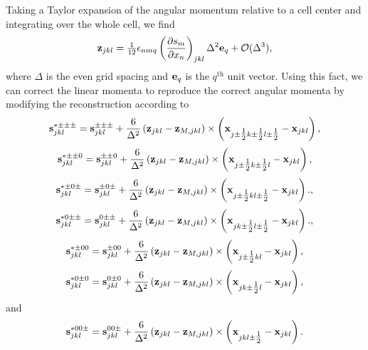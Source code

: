 \documentclass{aastex63}
\begin{document}
Taking a Taylor expansion of the angular momentum relative to a cell center and integrating over the whole cell, we find
\begin{equation}
{\vect{z}}_{j k l} = \tfrac{1}{12} \epsilon_{n m q} \left(\frac{\partial s_{m}}{\partial x_n}\right)_{j k l} \Delta^2 \vect{e}_q + \vect{\mathcal{O}}(\Delta^3),
\label{beg_cor}
\end{equation}
where $\Delta$ is the even grid spacing and ${\bf e}_q$ is the $q^\mathrm{th}$ unit vector. Using this fact, we can correct the linear momenta to reproduce the
correct angular momenta by modifying the reconstruction according to
\begin{equation}
\vect{s}^{* \pm\pm\pm}_{j k l} = \vect{s}^{\pm\pm\pm}_{j k l} + \frac{6}{\Delta^2} \left(\vect{z}_{j k l} - \vect{z}_{M, j k l}\right) \times \left( \vect{x}_{j\pm\tfrac{1}{2} k\pm\tfrac{1}{2} l\pm\tfrac{1}{2}} - \vect{x}_{j k l} \right),
\end{equation}
\begin{equation}
\vect{s}^{* \pm\pm 0}_{j k l} = \vect{s}^{\pm\pm 0}_{j k l} + \frac{6}{\Delta^2} \left(\vect{z}_{j k l} - \vect{z}_{M, j k l}\right) \times \left( \vect{x}_{j\pm\tfrac{1}{2} k\pm\tfrac{1}{2} l} - \vect{x}_{j k l} \right),
\end{equation}
\begin{equation}
\vect{s}^{* \pm 0 \pm}_{j k l} = \vect{s}^{\pm 0 \pm}_{j k l} + \frac{6}{\Delta^2} \left(\vect{z}_{j k l} - \vect{z}_{M, j k l}\right) \times \left( \vect{x}_{j\pm\tfrac{1}{2} k l\pm\tfrac{1}{2}} - \vect{x}_{j k l} \right).,
\end{equation}
\begin{equation}
\vect{s}^{* 0 \pm\pm}_{j k l} = \vect{s}^{ 0 \pm\pm}_{j k l} + \frac{6}{\Delta^2} \left(\vect{z}_{j k l} - \vect{z}_{M, j k l}\right) \times \left( \vect{x}_{j k\pm\tfrac{1}{2} l\pm\tfrac{1}{2}} - \vect{x}_{j k l} \right).,
\end{equation}
\begin{equation}
\vect{s}^{* \pm 0 0}_{j k l} = \vect{s}^{\pm 0  0}_{j k l} + \frac{6}{\Delta^2} \left(\vect{z}_{j k l} - \vect{z}_{M, j k l}\right) \times \left( \vect{x}_{j\pm\tfrac{1}{2} k l} - \vect{x}_{j k l} \right),
\end{equation}
\begin{equation}
\vect{s}^{* 0 \pm 0}_{j k l} = \vect{s}^{0\pm 0}_{j k l} + \frac{6}{\Delta^2} \left(\vect{z}_{j k l} - \vect{z}_{M, j k l}\right) \times \left( \vect{x}_{j k\pm\tfrac{1}{2} l} - \vect{x}_{j k l} \right),
\end{equation}
and
\begin{equation}
\vect{s}^{* 0 0 \pm }_{j k l} = \vect{s}^{0  0\pm }_{j k l} + \frac{6}{\Delta^2} \left(\vect{z}_{j k l} - \vect{z}_{M, j k l}\right) \times \left( \vect{x}_{j k l\pm\tfrac{1}{2}} - \vect{x}_{j k l} \right).
\label{end_cor}
\end{equation}
\end{document}
